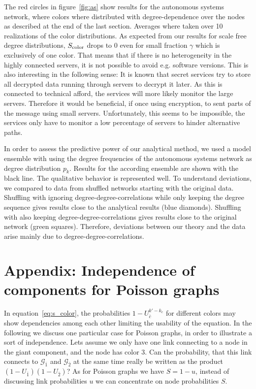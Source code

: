 \documentclass[aps, pre, onecolumn, a4paper, floatfix]{revtex4}
\begin{document}
The red circles in figure~\ref{fig:as} show results for the autonomous systems network, where colors 
where distributed with degree-dependence over the nodes as described at the end of the last section. 
Averages where taken over 10 realizations of the color distributions. As expected from our results 
for scale free degree distributions, $S_{\rm color}$ drops to 0 even for small fraction $\gamma$ 
which is exclusively of one color. That means that if there is no heterogeneity in the highly 
connected servers, it is not possible to avoid e.g. software versions. This is also 
interesting in the following sense: It is known that secret services try to store all decrypted data 
running through servers to decrypt it later. As this is connected to technical afford, 
the services will more likely monitor the large servers. Therefore it would be beneficial, if once 
using encryption, to sent parts of the message using small servers. Unfortunately, this seems to 
be impossible, the services only have to monitor a low percentage of servers to hinder alternative 
paths. 

In order to assess the predictive power of our analytical method, we used a model ensemble with 
using the degree frequencies of the autonomous systems network as degree distribution $p_k$. 
Results for the according ensemble are shown with the black line. The qualitative 
behavior is represented well. To understand deviations, we compared to data from shuffled networks 
starting with the original data. Shuffling with ignoring degree-degree-correlations while only 
keeping the degree sequence gives results close to the analytical results (blue diamonds). 
Shuffling with also keeping degree-degree-correlations gives results close to the original network 
(green squares). 
Therefore, deviations between our theory and the data arise mainly due to degree-degree-correlations. 



\section*{Appendix: Independence of components for Poisson graphs}

In equation~\ref{eq:s_color}, the probabilities $1-U_{\bar c}^{k'-k_c}$ for 
different colors may show dependencies 
among each other limiting the usability of the equation. In the following we 
discuss one particular case for Poisson graphs, in order to illustrate a sort 
of independence. Lets assume we only have one link connecting to a node in the 
giant component, and the node has color 3. Can the probability, that this link connects 
to ${\mathcal G}_{\bar 1}$ and ${\mathcal G}_{\bar 2}$ at the same time 
really be written as the product $(1-U_{\bar 1})(1-U_{\bar 2})$? 
As for Poisson graphs we 
have $S=1-u$, instead of discussing link probabilities $u$ we can concentrate on 
node probabilities $S$. 
\end{document}
